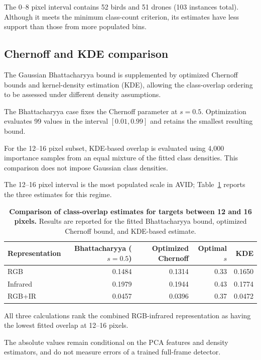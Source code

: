 \documentclass[10pt]{article}
\newcommand{\dataset}{\textsc{AVID}}
\begin{document}
The 0--8 pixel interval contains 52 birds and 51 drones (103 instances total). Although it meets the minimum class-count criterion, its estimates have less support than those from more populated bins.

\subsection{Chernoff and KDE comparison}

The Gaussian Bhattacharyya bound is supplemented by optimized Chernoff bounds and kernel-density estimation (KDE), allowing the class-overlap ordering to be assessed under different density assumptions.

The Bhattacharyya case fixes the Chernoff parameter at $s=0.5$. Optimization evaluates 99 values in the interval $[0.01,0.99]$ and retains the smallest resulting bound.

For the 12--16 pixel subset, KDE-based overlap is evaluated using 4,000 importance samples from an equal mixture of the fitted class densities. This comparison does not impose Gaussian class densities.

The 12--16 pixel interval is the most populated scale in \dataset{}; Table~\ref{tab:crosschecks} reports the three estimates for this regime.

\begin{table}[h]
\centering
\caption{\textbf{Comparison of class-overlap estimates for targets between 12 and 16 pixels.}
Results are reported for the fitted Bhattacharyya bound, optimized Chernoff bound, and KDE-based estimate.}
\label{tab:crosschecks}
\small
\begin{tabular}{lrrrr}
\toprule
Representation
& Bhattacharyya ($s=0.5$)
& Optimized Chernoff
& Optimal $s$
& KDE \\
\midrule
RGB
& 0.1484 & 0.1314 & 0.33 & 0.1650 \\
Infrared
& 0.1979 & 0.1944 & 0.43 & 0.1774 \\
RGB+IR
& 0.0457 & 0.0396 & 0.37 & 0.0472 \\
\bottomrule
\end{tabular}
\end{table}

All three calculations rank the combined RGB-infrared representation as having the lowest fitted overlap at 12--16 pixels.

The absolute values remain conditional on the PCA features and density estimators, and do not measure errors of a trained full-frame detector.
\end{document}
